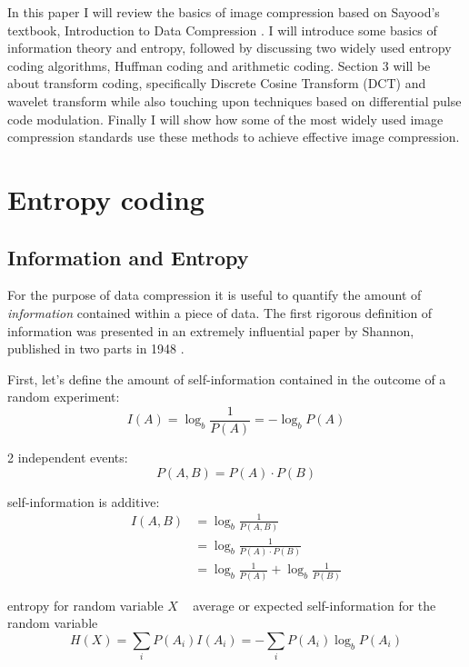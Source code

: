 In this paper I will review the basics of image compression based on Sayood's textbook, Introduction to Data Compression \cite{sayood_introduction_2012}. 
I will introduce some basics of information theory and entropy, followed by discussing two widely used entropy coding algorithms, Huffman coding and arithmetic coding. Section 3 will be about transform coding, specifically Discrete Cosine Transform (DCT) and wavelet transform while also touching upon techniques based on differential pulse code modulation. Finally I will show how some of the most widely used image compression standards use these methods to achieve effective image compression.

\section{Entropy coding}
\subsection{Information and Entropy}
For the purpose of data compression it is useful to quantify the amount of \textit{information} contained within a piece of data. The first rigorous definition of information was presented in an extremely influential paper by Shannon, published in two parts in 1948 \cite{shannon_mathematical_1948, shannon_mathematical_1948-1}.

First, let's define the amount of self-information contained in the outcome of a random experiment:
\begin{equation}
I(A) = \log_b \frac{1}{P(A)} = - \log_b P(A)
\end{equation}

2 independent events:
\begin{equation}
P(A,B) = P(A) \cdot P(B)
\end{equation}

self-information is additive:
\begin{align}
I(A,B) &= \log_b \frac{1}{P(A,B)} \\
&= \log_b \frac{1}{P(A) \cdot P(B)} \\
&= \log_b \frac{1}{P(A)} + \log_b \frac{1}{P(B)}
\end{align}

entropy for random variable $X$ ~ average or expected self-information for the random variable
\begin{equation}
H(X) = \sum_i P(A_i)I(A_i) = - \sum_i P(A_i) \log_b P(A_i)
\end{equation}

